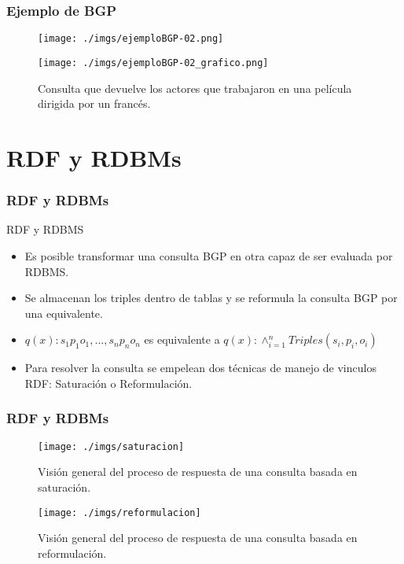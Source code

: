 \documentclass{beamer}
\begin{document}
\begin{frame}
\frametitle{Ejemplo de BGP}
\begin{figure}[ht]
\centering
\begin{minipage}[b]{0.45\linewidth}
\texttt{[image: ./imgs/ejemploBGP-02.png]}
\label{fig:minipage1}
\end{minipage}
\quad
\begin{minipage}[b]{0.45\linewidth}
\texttt{[image: ./imgs/ejemploBGP-02\_grafico.png]}
\label{fig:minipage2}
\end{minipage}

Consulta que devuelve los actores que trabajaron en una película dirigida por un francés.
\end{figure}
\end{frame}
\section{RDF y RDBMs}
\begin{frame}
\frametitle{RDF y RDBMs}
\begin{block}{RDF y RDBMS}
\begin{itemize}
\item{Es posible transformar una consulta BGP en otra capaz de ser evaluada por RDBMS.}
\item{Se almacenan los triples dentro de tablas y se reformula la consulta BGP por una equivalente.}
\item{$q(x) : s_{1} p_{1} o_{1}, ..., s_{n} p_{n} o_{n}$ es equivalente a $q(x): \wedge ^n _{i = 1} Triples(s_{i}, p_{i}, o_{i})$}
\item{Para resolver la consulta se empelean dos técnicas de manejo de vinculos RDF: Saturación o Reformulación.}
\end{itemize}
\end{block}
\end{frame}

\begin{frame}
\frametitle{RDF y RDBMs}

\begin{figure}[h]
\begin{center}
\texttt{[image: ./imgs/saturacion]}
\caption{Visión general del proceso de respuesta de una consulta basada en saturación.}
\end{center}
\end{figure}

\begin{figure}[H]
\begin{center}
\texttt{[image: ./imgs/reformulacion]}
\caption{Visión general del proceso de respuesta de una consulta basada en reformulación.}
\end{center}
\end{figure}
\end{frame}
\end{document}
